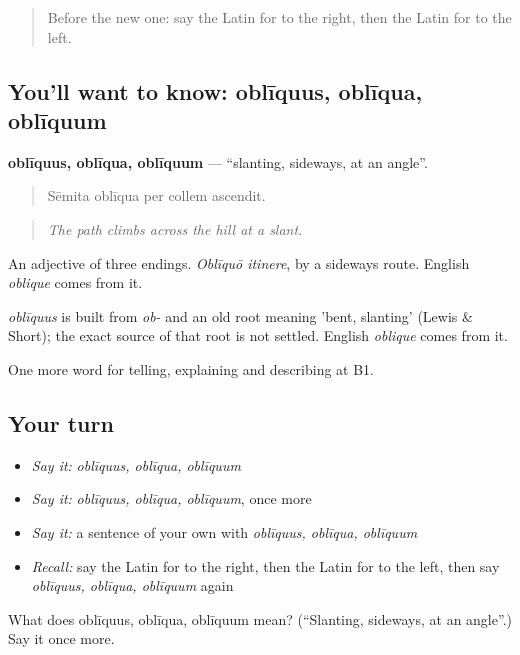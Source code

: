 \begin{quote}
Before the new one: say the Latin for to the right, then the Latin for to the left.
\end{quote}

\subsection*{You'll want to know: oblīquus, oblīqua, oblīquum}
\textbf{oblīquus, oblīqua, oblīquum} — \textquotedblleft{}slanting, sideways, at an angle\textquotedblright{}.

\begin{quote}
Sēmita oblīqua per collem ascendit.
\end{quote}

\begin{quote}
\emph{The path climbs across the hill at a slant.}
\end{quote}

An adjective of three endings. \emph{Oblīquō itinere}, by a sideways route. English \emph{oblique} comes from it.

\begin{cousinweb}
\emph{oblīquus} is built from \emph{ob-} and an old root meaning 'bent, slanting' (Lewis \& Short); the exact source of that root is not settled. English \emph{oblique} comes from it.
\end{cousinweb}

\begin{grammarlens}[title={What you've built}]
One more word for telling, explaining and describing at B1.
\end{grammarlens}

\subsection*{Your turn}
\begin{itemize}
\raggedright
  \item \emph{Say it:} \emph{oblīquus, oblīqua, oblīquum}
  \item \emph{Say it:} \emph{oblīquus, oblīqua, oblīquum}, once more
  \item \emph{Say it:} a sentence of your own with \emph{oblīquus, oblīqua, oblīquum}
  \item \emph{Recall:} say the Latin for to the right, then the Latin for to the left, then say \emph{oblīquus, oblīqua, oblīquum} again
\end{itemize}

\begin{tcolorbox}[breakable,colback=teal!4,colframe=teal!35!black,title={Before you move on}]
What does oblīquus, oblīqua, oblīquum mean? (\textquotedblleft{}Slanting, sideways, at an angle\textquotedblright{}.) Say it once more.
\end{tcolorbox}
